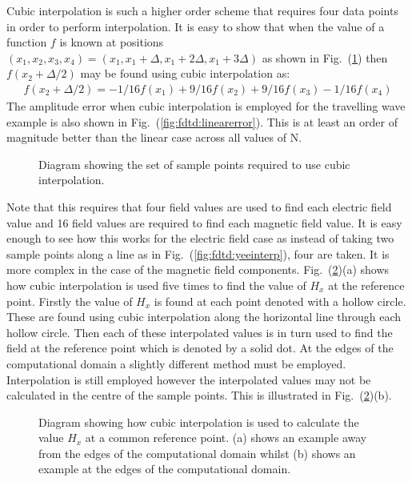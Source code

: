 \documentclass[a4paper, 12pt]{article}
\newcommand{\rfig}[1]{Fig.\ (\ref{#1})}
\begin{document}
	Cubic interpolation is such a
	higher order scheme that requires four data points in order to perform
	interpolation. It is easy to show that when the value of a function
	$f$ is known at positions $(x_1,x_2,x_3,x_4) =
	(x_1,x_1+\Delta,x_1+2\Delta,x_1+3\Delta)$ as shown in
	\rfig{fig:fdtd:cubicinterp} then $f(x_2+\Delta/2)$ may be found using
	cubic interpolation as:
	\begin{eqnarray}
		\label{eq:fdtd:cubicinterp}
		f(x_2+\Delta/2) = -1/16f(x_1)+9/16f(x_2)+9/16f(x_3)-1/16f(x_4)
	\end{eqnarray}
	The amplitude error when cubic interpolation is employed for the
	travelling wave example is also shown in
	\rfig{fig:fdtd:linearerror}. This is at least an order of magnitude
	better than the linear case across all values of N.
	\begin{figure}[!h]
		\centering
		\caption{Diagram showing the set of sample points required to use
			cubic interpolation.}
		\label{fig:fdtd:cubicinterp}
	\end{figure}

	Note that this requires that four field values are used to find each
	electric field value and 16 field values are required to find each
	magnetic field value. It is easy enough to see how this works for the
	electric field case as instead of taking two sample points along a
	line as in \rfig{fig:fdtd:yeeinterp}, four are taken. It is more
	complex in the case of the magnetic field
	components. \rfig{fig:fdtd:cubichx}(a) shows how cubic interpolation is
	used five times to find the value of $H_x$ at the reference
	point. Firstly the value of $H_x$ is found at each point denoted with
	a hollow circle. These are found using cubic interpolation along the
	horizontal line through each hollow circle. Then each of these
	interpolated values is in turn used to find the field at the
	reference point which is denoted by a solid dot. At the edges of the
	computational domain a slightly different method must be
	employed. Interpolation is still employed however the interpolated
	values may not be calculated in the centre of the sample points. This
	is illustrated in \rfig{fig:fdtd:cubichx}(b).

	\begin{figure}[!h]
		\centering
		\caption{Diagram showing how cubic interpolation is used to
			calculate the value $H_x$ at a common reference point. (a) shows an
			example away from the edges of the computational domain whilst (b)
			shows an example at the edges of the computational domain.}
		\label{fig:fdtd:cubichx}
	\end{figure}
\end{document}
